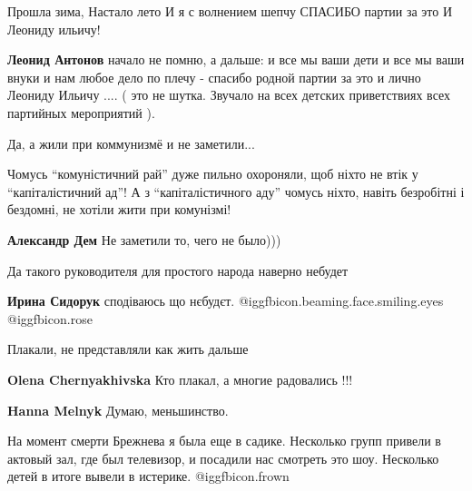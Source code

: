 \begin{itemize}

\obeycr
Прошла зима,
Настало лето
И я с волнением шепчу
СПАСИБО партии за это
И Леониду ильичу!
\restorecr

\begin{itemize} %
\textbf{Леонид Антонов} начало не помню, а дальше: и все мы ваши дети и все мы ваши внуки и нам любое дело по плечу - спасибо родной партии за это и лично Леониду Ильичу .... ( это не шутка. Звучало на всех детских приветствиях всех партийных мероприятий ).
\end{itemize} %

Да, а жили при коммунизмё и не заметили...

\begin{itemize} %

Чомусь \enquote{комуністичний рай} дуже пильно охороняли, щоб ніхто не втік у \enquote{капіталістичний ад}!
А з \enquote{капіталістичного аду} чомусь ніхто, навіть безробітні і бездомні, не хотіли жити при комунізмі!

\textbf{Александр Дем} Не заметили то, чего не было)))
\end{itemize} %

Да такого руководителя для простого народа наверно небудет

\textbf{Ирина Сидорук} сподіваюсь що нєбудєт.  @igg{fbicon.beaming.face.smiling.eyes}  @igg{fbicon.rose} 

Плакали, не представляли как жить дальше

\begin{itemize} %
\textbf{Olena Chernyakhivska} Кто плакал, а многие радовались !!!

\textbf{Hanna Melnyk} Думаю, меньшинство.
\end{itemize} %


На момент смерти Брежнева я была еще в садике. Несколько групп привели в
актовый зал, где был телевизор, и посадили нас смотреть это шоу. Несколько
детей в итоге вывели в истерике.  @igg{fbicon.frown} 


\end{itemize} %
